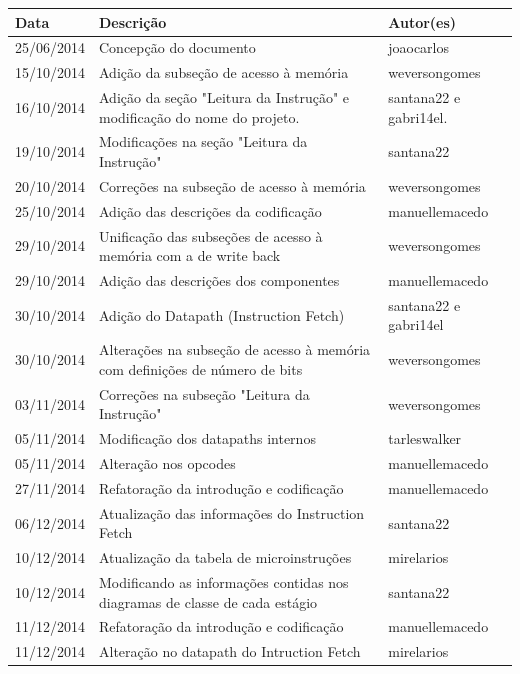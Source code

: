 \documentclass{report}
\begin{document}
\begin{table}[h!]
\begin{longtable}[pos]{|m{2cm} | m{7.2cm} | m{3.8cm}|}
\textbf{Data} & \cellcolor[gray]{0.9}\textbf{Descrição} & \cellcolor[gray]{0.9} \textbf{Autor(es)}\\ \hline
      \small 25/06/2014 & \small Concepção do documento & \small joaocarlos \\ \hline
      \small 15/10/2014 & \small Adição da subseção de acesso à memória & \small weversongomes \\ \hline
      \small 16/10/2014 & \small Adição da seção "Leitura da Instrução" e modificação do nome do projeto. & \small santana22 e gabri14el.\\ \hline
      \small 19/10/2014 & \small Modificações na seção "Leitura da Instrução" & \small santana22 \\ \hline
      \small 20/10/2014 & \small Correções na subseção de acesso à memória & \small weversongomes \\ \hline
      \small 25/10/2014 & \small Adição das descrições da codificação & \small manuellemacedo \\ \hline
      \small 29/10/2014 & \small Unificação das subseções de acesso à memória com a de write back & \small weversongomes \\ \hline
      \small 29/10/2014 & \small Adição das descrições dos componentes & \small manuellemacedo \\ \hline
      \small 30/10/2014 & \small Adição do Datapath (Instruction Fetch) & \small santana22 e gabri14el \\ \hline
      \small 30/10/2014 & \small Alterações na subseção de acesso à memória com definições de número de bits & \small weversongomes \\ \hline
      \small 03/11/2014 & \small Correções na subseção "Leitura da Instrução" & \small weversongomes \\ \hline
      \small 05/11/2014 & \small Modificação dos datapaths internos & \small tarleswalker \\ \hline
      \small 05/11/2014 & \small Alteração nos opcodes & \small manuellemacedo \\ \hline
      \small 27/11/2014 & \small Refatoração da introdução e codificação & \small manuellemacedo \\ \hline
      \small 06/12/2014 & \small Atualização das informações do Instruction Fetch & \small santana22 \\ \hline
      \small 10/12/2014 & \small Atualização da tabela de microinstruções  & \small mirelarios \\ \hline
      \small 10/12/2014 & \small Modificando as informações contidas nos diagramas de classe de cada estágio  & \small  santana22 \\ \hline
      \small 11/12/2014 & \small Refatoração da introdução e codificação & \small manuellemacedo \\ \hline
      \small 11/12/2014 & \small Alteração no datapath do Intruction Fetch  & \small mirelarios \\ \hline
	\end{longtable}
	\end{table}
\end{document}
